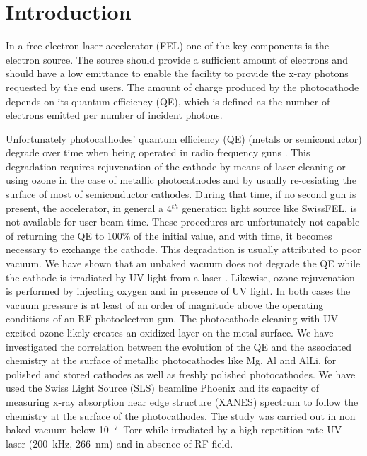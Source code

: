 \documentclass[aip,graphicx]{revtex4-1}
\begin{document}

\maketitle %

\section{Introduction}

In a free electron laser accelerator (FEL) one of the key components is the electron source. The source should provide a sufficient amount of electrons and should have a low emittance to enable the facility to provide the x-ray photons requested by the end users. The amount of charge produced by the photocathode depends on its quantum efficiency (QE), which is defined as the number of electrons emitted per number of incident photons.

Unfortunately photocathodes' quantum efficiency (QE) (metals or semiconductor) degrade over time when being operated in radio frequency guns \cite{Lecce:2011,lepimpec:2013}. This degradation requires rejuvenation of the cathode by means of laser cleaning or using ozone \cite{Trovo:Lecce2011} in the case of metallic photocathodes and by usually re-cesiating the surface of most of semiconductor cathodes. During that time, if no second gun is present, the accelerator, in general a 4$^{th}$ generation light source like SwissFEL, is not available for user beam time. These procedures are unfortunately not capable of returning the QE to 100\% of the initial value, and with time, it becomes necessary to exchange the cathode.
This degradation is usually attributed to poor vacuum. We have shown that an unbaked vacuum does not degrade the QE while the cathode is irradiated by UV light from a laser \cite{lepimpec:2013}. Likewise, ozone rejuvenation is performed by injecting oxygen and in presence of UV light. In both cases the vacuum pressure is at least of an order of magnitude above the operating conditions of an RF photoelectron gun. The photocathode cleaning with UV-excited ozone likely creates an oxidized layer on the metal surface.
We have investigated the correlation between the evolution of the QE and the associated chemistry at the surface of metallic photocathodes like Mg, Al and AlLi, for polished and stored cathodes as well as freshly polished photocathodes. We have used the Swiss Light Source (SLS) beamline Phoenix \cite{PHOENIX:SLS} and its capacity of measuring  x-ray absorption near edge structure (XANES) spectrum to follow the chemistry at the surface of the photocathodes. The study was carried out in non baked vacuum below 10$^{-7}$~Torr while irradiated by a high repetition rate UV laser (200~kHz, 266~nm) and in absence of RF field.
\end{document}
